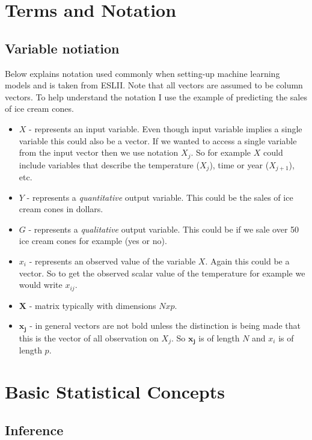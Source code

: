 \documentclass[paper=a4, fontsize=11pt]{scrartcl} %
\numberwithin{equation}{section} %
\numberwithin{figure}{section} %
\numberwithin{table}{section} %
\begin{document}
\section{Terms and Notation}

\subsection{Variable notiation}
\label{sec:notation}

Below explains notation used commonly when setting-up machine learning models and is taken from ESLII. Note that all vectors are assumed to be column vectors. To help understand the notation I use the example of predicting the sales of ice cream cones. 
\vspace{2mm}

\begin{itemize}
\item $X$ - represents an input variable. Even though input variable implies a single variable this could also be a vector. If we wanted to access a single variable from the input vector then we use notation $X_j$. So for example $X$ could include variables that describe the temperature ($X_{j}$), time or year ($X_{j+1}$), etc. 
\item $Y$ - represents a \emph{quantitative} output variable. This could be the sales of ice cream cones in dollars.
\item $G$ - represents a \emph{qualitative} output variable. This could be if we sale over 50 ice cream cones for example (yes or no). 
\item $x_i$ - represents an observed value of the variable $X$. Again this could be a vector. So to get the observed scalar value of the temperature for example we would write $x_{ij}$. 
\item $\bm{X}$ - matrix typically with dimensions $Nxp$. 
\item $\bm{x_j}$ -  in general vectors are not bold unless the distinction is being made that this is the vector of all observation on $X_j$. So $\bm{x_j}$ is of length $N$ and $x_i$ is of length $p$.
\end{itemize}


\section{Basic Statistical Concepts}

\subsection{Inference}
\end{document}
